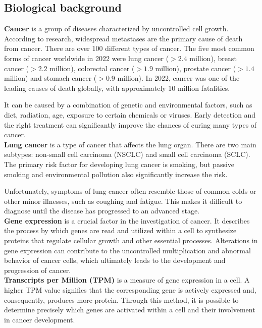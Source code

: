 \subsection{Biological background} \label{subsec:biological_background}
\textbf{Cancer} is a group of diseases characterized by uncontrolled cell growth.
According to research, widespread metastases are the primary cause of death from cancer\cite{who_cancer_fact_sheet}.
There are over 100 different types of cancer\cite{nci_cancer_types}.
The five most common forms of cancer worldwide in 2022 were lung cancer ($>2.4$ million),
breast cancer ($>2.2$ million), colorectal cancer ($>1.9$ million), prostate cancer ($>1.4$ million) and
stomach cancer ($>0.9$ million).
In 2022, cancer was one of the leading causes of death globally,
with approximately 10 million fatalities\cite{ferlay2024global}.

It can be caused by a combination of genetic and environmental factors,
such as diet, radiation, age, exposure to certain chemicals or viruses\cite{nci_cancer_risk}.
Early detection and the right treatment can significantly improve the chances of curing many types of cancer.
\\

\textbf{Lung cancer} is a type of cancer that affects the lung organ.
There are two main subtypes: non-small cell carcinoma (NSCLC) and small cell carcinoma (SCLC)\cite{nci_lung_cancer_types}.
The primary risk factor for developing lung cancer is smoking,
but passive smoking and environmental pollution also significantly increase the risk.

Unfortunately, symptoms of lung cancer often resemble those of common colds or other minor illnesses,
such as coughing and fatigue.
This makes it difficult to diagnose until the disease has progressed to an advanced stage\cite{who_lung_cancer}.
\\

\textbf{Gene expression} is a crucial factor in the investigation of cancer.
It describes the process by which genes are read and utilized within a cell to synthesize proteins
that regulate cellular growth and other essential processes.
Alterations in gene expression can contribute to the uncontrolled multiplication and abnormal behavior of cancer cells,
which ultimately leads to the development and progression of cancer.
\\

\textbf{Transcripts per Million (TPM)} is a measure of gene expression in a cell.
A higher TPM value signifies that the corresponding gene is actively expressed and, consequently, produces more protein.
Through this method, it is possible to determine precisely which genes are activated within a cell and
their involvement in cancer development.

